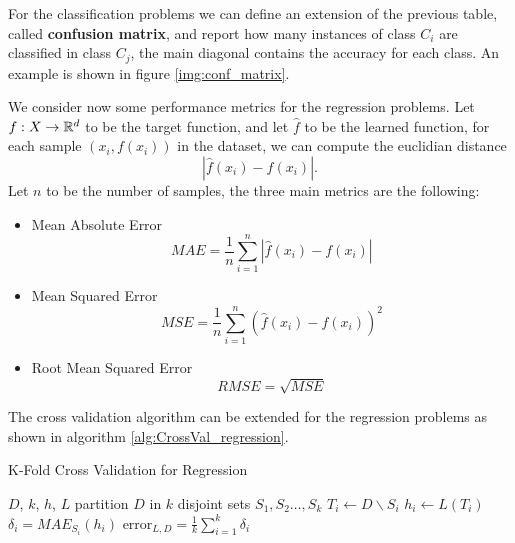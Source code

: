 \documentclass[10pt, letterpaper]{report}
\begin{document}
For the classification problems we can define an extension of the previous table, called \textbf{confusion matrix}, and report how many instances of class $C_i$ are classified in class $C_j$, the main diagonal contains the accuracy for each class. An example is shown in figure \ref{img:conf_matrix}.\bigskip

We consider now some performance metrics for the regression problems. Let $f:X\rightarrow{\mathbb R}^d$ to be the target function, and let $\hat f$ to be the learned function, for each sample $(x_i,f(x_i))$ in the dataset, we can compute the euclidian distance\begin{equation}
	|\hat f(x_i)-f(x_i)|.
\end{equation}
Let $n$ to be the number of samples, the three main metrics are the following:\begin{itemize}
	\item Mean Absolute Error\begin{equation}
		      MAE=\frac{1}{n}\sum_{i=1}^n|\hat f(x_i)-f(x_i)|
	      \end{equation}
	\item Mean Squared Error\begin{equation}
		      MSE=\frac{1}{n}\sum_{i=1}^n(\hat f(x_i)-f(x_i))^2
	      \end{equation}
	\item Root Mean Squared Error\begin{equation}
		      RMSE=\sqrt{MSE}
	      \end{equation}
\end{itemize}

The cross validation algorithm can be extended for the regression problems as shown in algorithm \ref{alg:CrossVal_regression}.

\begin{algorithm}
	\caption{K-Fold Cross Validation for Regression}\label{alg:CrossVal_regression}
	\begin{algorithmic}
		\Require $D$, $k$, $h$, $L$
		\State partition $D$ in $k$ disjoint sets $S_1,S_2\dots, S_k$
		\State $T_i\leftarrow  D\backslash S_i$
		\State $h_i\leftarrow L(T_i) $
		\State $\delta_i = MAE_{S_i}(h_i)$
		\EndFor
		\State\Return $\text{error}_{L,D}=\displaystyle\frac{1}{k}\sum_{i=1}^k\delta_i$
	\end{algorithmic}
\end{algorithm}
\end{document}

